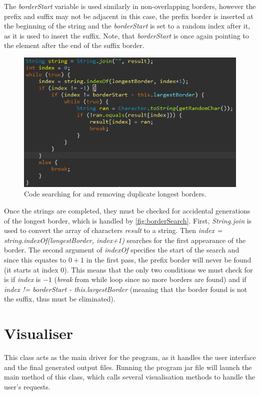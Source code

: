 \documentclass{l4proj}
\begin{document}
The \emph{borderStart} variable is used similarly in non-overlapping borders, however the prefix and suffix may not be adjacent in this case, the prefix border is inserted at the beginning of the string and the \emph{borderStart} is set to a random index after it, as it is used to insert the suffix. Note, that \emph{borderStart} is once again pointing to the element after the end of the suffix border.

\begin{figure}
    \centering
    \includegraphics[width=0.7\linewidth]{images/borderSearch.png}    

    \caption{Code searching for and removing duplicate longest borders.}
    \label{fig:borderSearch} 
\end{figure}

Once the strings are completed, they must be checked for accidental generations of the longest border, which is handled by \autoref{fig:borderSearch}. First, \emph{String.join} is used to convert the array of characters \emph{result} to a string. Then \emph{index = string.indexOf(longestBorder, index+1)} searches for the first appearance of the border. The second argument of \emph{indexOf} specifies the start of the search and since this equates to $0+1$ in the first pass, the prefix border will never be found (it starts at index $0$). This means that the only two conditions we must check for is if \emph{index} is $-1$ (\emph{break} from while loop since no more borders are found) and if \emph{index != borderStart - this.largestBorder} (meaning that the border found is not the suffix, thus must be eliminated).

\section{Visualiser}

This class acts as the main driver for the program, as it handles the user interface and the final generated output files. Running the program jar file will launch the main method of this class, which calls several visualisation methods to handle the user's requests. 
\end{document}
